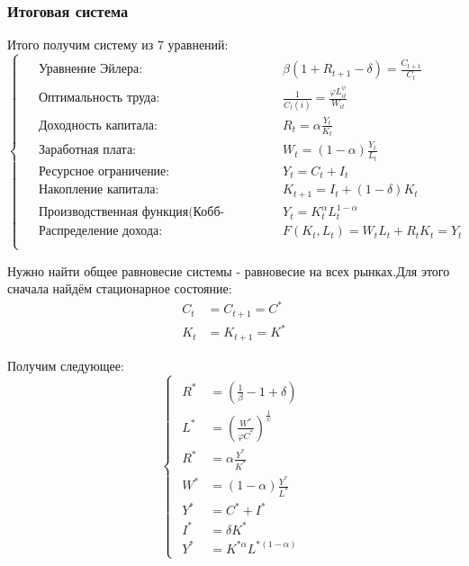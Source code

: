 \documentclass[a4paper,12pt]{article}
\begin{document}
{\subsubsection{Итоговая система}
Итого получим систему из 7 уравнений:
\begin{equation}
    \begin{cases}
    \begin{alignedat}{2}
    &\text{Уравнение Эйлера:} 
    && \beta (1 + R_{t+1} - \delta) = \frac{C_{t+1}}{C_t} \\
    &\text{Оптимальность труда:} 
    && \frac{1}{C_t(i)} = \frac{\varphi L_{it}^\psi}{W_{it}} \\
    &\text{Доходность капитала:} 
    && R_t = \alpha \frac{Y_t}{K_t} \\
    &\text{Заработная плата:} 
    && W_t = (1-\alpha) \frac{Y_t}{L_t} \\
    &\text{Ресурсное ограничение:} 
    && Y_t = C_t + I_t \\
    &\text{Накопление капитала:}
    && K_{t+1} = I_t + (1-\delta)K_t \\
    &\text{Производственная функция(Кобб-Дуглас): }
    && Y_t = K_t^\alpha L_t^{1-\alpha} \\
    &\text{Распределение дохода:}
    && F(K_t,L_t) = W_t L_t + R_t K_t = Y_t \\
    \end{alignedat}
    \end{cases}
    \label{eq:system}
\end{equation}

Нужно найти общее равновесие системы - равновесие на всех рынках.Для этого сначала найдём стационарное состояние:
\begin{align}
    C_t &= C_{t+1} = C^{*}  \\
    K_t &= K_{t+1} = K^{*}
\end{align}

Получим следующее:
\begin{equation}
    \begin{cases}
    \begin{alignedat}{2}
    R^{*} &= (\frac{1}{\beta} - 1 + \delta) \\
    L^{*} &= \left(\frac{W^{*}}{\varphi C^{*}}\right)^{\frac{1}{\psi}}\\
    R^{*} &= \alpha \frac{Y^{*}}{K^{*}} \\
    W^{*} &= (1-\alpha) \frac{Y^{*}}{L^{*}} \\
    Y^{*} &= C^{*} + I^{*} \\
    I^{*} &= \delta K^{*} \\
    Y^{*} &= K^{* \alpha} L^{* (1-\alpha)}
    \end{alignedat}
    \end{cases}
    \label{eq:system_stationary}
\end{equation}

}
\end{document}
